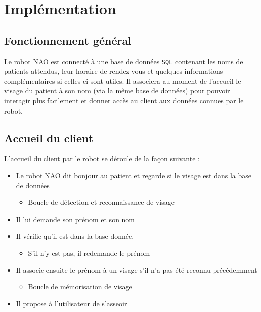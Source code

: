 \documentclass{article}
\begin{document}
\section{Implémentation}

\subsection*{Fonctionnement général}
Le robot NAO est connecté à une base de données \texttt{SQL} contenant les noms de patients attendus, leur horaire de rendez-vous et quelques informations complémentaires si celles-ci sont utiles.
Il associera au moment de l'accueil le visage du patient à son nom (via la même base de données) pour pouvoir interagir plus facilement et donner accès au client aux données connues par le robot.

\subsection*{Accueil du client}

\noindent L'accueil du client par le robot se déroule de la façon suivante : 

\begin{itemize}[parsep=0.1cm,itemsep=0.1cm,topsep=0.1cm]
    \item Le robot NAO dit bonjour au patient et regarde si le visage est dans la base de données
    \begin{itemize}[label=\rightarrow, font=\small, leftmargin=0.5cm ,parsep=0cm,itemsep=0cm,topsep=0cm]
        \item Boucle de détection et reconnaissance de visage
    \end{itemize}
    \item Il lui demande son prénom et son nom
    \item Il vérifie qu'il est dans la base donnée. 
    
    \begin{itemize}[label=\rightarrow, font=\small, leftmargin=0.5cm ,parsep=0cm, itemsep=0cm, topsep=0cm]
        \item S'il n'y est pas, il redemande le prénom
    \end{itemize}
    \item Il associe ensuite le prénom à un visage s'il n'a pas été reconnu précédemment 
    
    \begin{itemize}[label=\rightarrow, font=\small, leftmargin=0.5cm ,parsep=0cm,itemsep=0cm,topsep=0cm]
        \item Boucle de mémorisation de visage
    \end{itemize}
    
    \item Il propose à l'utilisateur de s'asseoir
    
    
\end{itemize}
\end{document}
